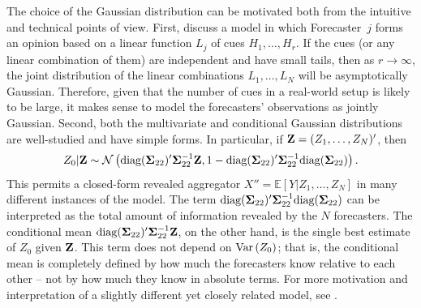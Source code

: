 \documentclass[11pt]{article}
\newcommand{\E}{\mathbb{E}}
\theoremstyle{definition}
\theoremstyle{definition}
\def\bSigma{{\bf \Sigma}}
\def\Z{{\bf Z}}
\def\E{{\mathbb E}}
\def\Var{{\rm Var}\,}
\def\diag{\text{diag}}
\def\diag{\text{diag}}
\begin{document}
The choice of the Gaussian distribution can be motivated both from the intuitive and technical points of view. First, \citet{broomell2009experts} discuss a model in which 
Forecaster~$j$ forms an opinion based on a linear function $L_j$ of cues
$H_1 , \ldots , H_r$.
If
the cues (or any linear combination of them) are independent
and have small tails, then as $r \to \infty$, the joint distribution
of the linear combinations $L_1 , \ldots , L_N$ will be asymptotically
Gaussian.  Therefore, given that the number of cues in a real-world setup is likely to be large, it makes sense
to model the forecasters' observations as jointly Gaussian.  Second, both the multivariate and conditional Gaussian distributions are well-studied and have simple forms. 
In particular, if $\Z = (Z_{1}, \dots, Z_{N})'$, then $$Z_0 | \Z \sim \mathcal{N}\left(\diag(\bSigma_{22})' \bSigma_{22}^{-1} \Z, 1-\diag(\bSigma_{22})' \bSigma_{22}^{-1}\diag(\bSigma_{22})\right).$$ This permits a closed-form revealed aggregator $X'' = \E[Y | Z_1, \dots, Z_N]$ in many different instances of the model. The term $\diag(\bSigma_{22})' \bSigma_{22}^{-1}\diag(\bSigma_{22})$ can be interpreted as the total amount of information revealed by the $N$ forecasters. The conditional mean $\diag(\bSigma_{22})' \bSigma_{22}^{-1} \Z$, on the other hand, is the single best estimate of $Z_0$ given $\Z$. This term does not depend on $\Var(Z_0)$; that is, the conditional mean is completely defined by how much the forecasters know relative to each other -- not by how much they know in absolute terms. 
For more motivation and interpretation of a slightly different yet closely related model, see \cite{satopaamodeling}.
\end{document}
